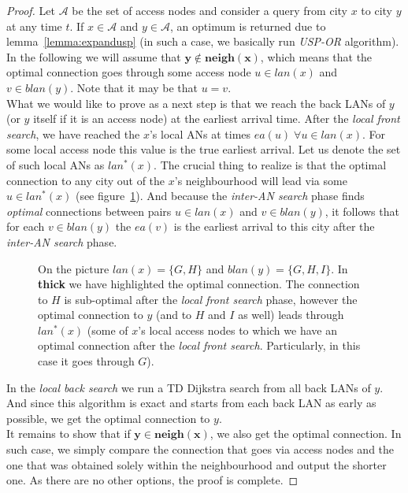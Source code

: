 		\begin{proof}
			Let $\mathcal{A}$ be the set of access nodes and consider a query from city $x$ to city $y$ at any time $t$. If $x \in \mathcal{A}$ and $y \in \mathcal{A}$, an optimum is returned due to lemma~\ref{lemma:expandusp} (in such a case, we basically run \textit{USP-OR} algorithm). \\
			
			\noindent In the following we will assume that $\bm{y \not \in neigh(x)}$, which means that the optimal connection goes through some access node $u \in lan(x)$ and $v \in blan(y)$. Note that it may be that $u = v$. \\
			
			\noindent What we would like to prove as a next step is that we reach the back LANs of $y$ (or $y$ itself if it is an access node) at the earliest arrival time. After the \textit{local front search}, we have reached the $x$'s local ANs at times $ea(u) \; \forall u \in lan(x)$. For some local access node this value is the true earliest arrival. Let us denote the set of such local ANs as $lan^{*}(x)$. The crucial thing to realize is that the optimal connection to any city out of the $x$'s neighbourhood will lead via some $u \in lan^{*}(x)$ (see figure~\ref{fig:usporaproof2}). And because the \textit{inter-AN search} phase finds \textit{optimal} connections between pairs $u \in lan(x)$ and $v \in blan(y)$, it follows that for each $v \in blan(y)$ the $ea(v)$ is the earliest arrival to this city after the \textit{inter-AN search} phase.
			
			\begin{figure}[h!]
				\begin{center}
				\end{center}
				\caption{\label{fig:usporaproof2} On the picture $lan(x) = \{G, H\}$ and $blan(y) = \{G, H, I\}$. In \textbf{thick} we have highlighted the optimal connection. The connection to $H$ is sub-optimal after the \textit{local front search} phase, however the optimal connection to $y$ (and to $H$ and $I$ as well) leads through $lan^{*}(x)$ (some of $x$'s local access nodes to which we have an optimal connection after the \textit{local front search}. Particularly, in this case it goes through $G$).}
			\end{figure}
			
			In the \textit{local back search} we run a TD Dijkstra search from all back LANs of $y$. And since this algorithm is exact and starts from each back LAN as early as possible, we get the optimal connection to $y$. \\
			
			\noindent It remains to show that if $\bm{y \in neigh(x)}$, we also get the optimal connection. In such case, we simply compare the connection that goes via access nodes and the one that was obtained solely within the neighbourhood and output the shorter one. As there are no other options, the proof is complete.
		\end{proof}
	
